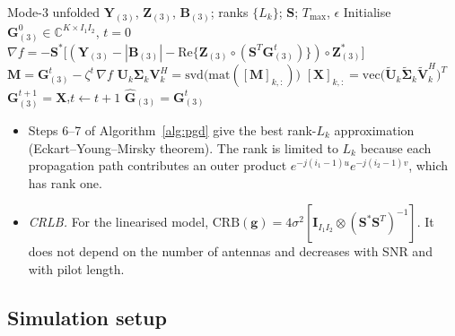 \documentclass[11pt,a4paper]{article}
\begin{document}
\begin{algorithm}[H]
\caption{Projected gradient descent (PGD), 2D array~\cite{xu2025channel}}
\label{alg:pgd}
\begin{algorithmic}[1]
\Require Mode-3 unfolded $\mathbf Y_{(3)}$, $\mathbf Z_{(3)}$, $\mathbf B_{(3)}$; ranks $\{L_k\}$; $\mathbf S$; $T_{\max}$, $\epsilon$
\State Initialise $\mathbf G_{(3)}^0\in\mathbb C^{K\times I_1I_2}$, $t=0$
\Repeat
  \State $\nabla f=-\mathbf S^*\big[(\mathbf Y_{(3)}-|\mathbf B_{(3)}|-\mathrm{Re}\{\mathbf Z_{(3)}\circ(\mathbf S^T\mathbf G^t_{(3)})\})\circ\mathbf Z^*_{(3)}\big]$
  \State $\mathbf M=\mathbf G^t_{(3)}-\zeta^t\,\nabla f$
    \State $\mathbf U_k\bm\Sigma_k\mathbf V_k^H=\mathrm{svd}\big(\mathrm{mat}([\mathbf M]_{k,:})\big)$
    \State $[\mathbf X]_{k,:}=\mathrm{vec}\big(\tilde{\mathbf U}_k\tilde{\bm\Sigma}_k\tilde{\mathbf V}_k^H\big)^T$
  \EndFor
  \State $\mathbf G^{t+1}_{(3)}=\mathbf X$,\quad $t\gets t+1$
\State \Return $\hat{\mathbf G}_{(3)}=\mathbf G^t_{(3)}$
\end{algorithmic}
\end{algorithm}

\begin{itemize}[leftmargin=*,itemsep=2pt]
  \item Steps 6--7 of Algorithm~\ref{alg:pgd} give the best rank-$L_k$ approximation
        (Eckart--Young--Mirsky theorem). The rank is limited to $L_k$ because each propagation
        path contributes an outer product $e^{-j(i_1-1)u}e^{-j(i_2-1)v}$, which has rank one.
  \item \textit{CRLB.} For the linearised model,
        $\mathrm{CRB}(\mathbf g)=4\sigma^2[\mathbf I_{I_1I_2}\otimes(\mathbf S^*\mathbf S^T)^{-1}]$. It
        does not depend on the number of antennas and decreases with SNR and with pilot length.
\end{itemize}

\subsection{Simulation setup}
\end{document}
